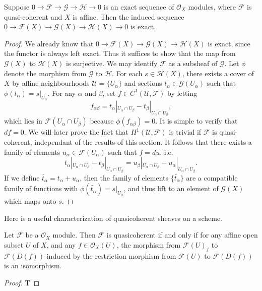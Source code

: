 \begin{theorem}
    Suppose $0 \to \mathcal{F} \to \mathcal{G} \to \mathcal{H} \to 0$ is an exact sequence of $\mathcal{O}_X$ modules, where $\mathcal{F}$ is quasi-coherent and $X$ is affine. Then the induced sequence $0 \to \mathcal{F}(X) \to \mathcal{G}(X) \to \mathcal{H}(X) \to 0$ is exact.
\end{theorem}
\begin{proof}
    We already know that $0 \to \mathcal{F}(X) \to \mathcal{G}(X) \to \mathcal{H}(X)$ is exact, since the functor is always left exact. Thus it suffices to show that the map from $\mathcal{G}(X)$ to $\mathcal{H}(X)$ is surjective. We may identify $\mathcal{F}$ as a subsheaf of $\mathcal{G}$. Let $\phi$ denote the morphism from $\mathcal{G}$ to $\mathcal{H}$. For each $s \in \mathcal{H}(X)$, there exists a cover of $X$ by affine neighbourhoods $\mathcal{U} = \{ U_\alpha \}$ and sections $t_\alpha \in \mathcal{G}(U_\alpha)$ such that $\phi(t_\alpha) = s|_{U_\alpha}$. For any $\alpha$ and $\beta$, set $f \in C^1(\mathcal{U},\mathcal{F})$ by letting
    \[ f_{\alpha \beta} = t_\alpha|_{U_\alpha \cap U_\beta} - t_\beta|_{U_\alpha \cap U_\beta}, \]
    which lies in $\mathcal{F}(U_\alpha \cap U_\beta)$ because $\phi(f_{\alpha \beta}) = 0$. It is simple to verify that $df = 0$. We will later prove the fact that $H^1(\mathcal{U},\mathcal{F})$ is trivial if $\mathcal{F}$ is quasi-coherent, independant of the results of this section. It follows that there exists a family of elements $u_\alpha \in \mathcal{F}(U_\alpha)$ such that $f = du$, i.e.
    \[ t_\alpha|_{U_\alpha \cap U_\beta} - t_\beta|_{U_\alpha \cap U_\beta} = u_\beta|_{U_\alpha \cap U_\beta} - u_\alpha|_{U_\alpha \cap U_\beta}. \]
    If we define $\tilde{t_\alpha} = t_\alpha + u_\alpha$, then the family of elements $\{ \tilde{t_\alpha} \}$ are a compatible family of functions with $\phi(\tilde{t_\alpha}) = s|_{U_\alpha}$, and thus lift to an element of $\mathcal{G}(X)$ which maps onto $s$.
\end{proof}

Here is a useful characterization of quasicoherent sheaves on a scheme.

\begin{theorem}
    Let $\mathcal{F}$ be a $\mathcal{O}_X$ module. Then $\mathcal{F}$ is quasicoherent if and only if for any affine open subset $U$ of $X$, and any $f \in \mathcal{O}_X(U)$, the morphism from $\mathcal{F}(U)_f$ to $\mathcal{F}(D(f))$ induced by the restriction morphism from $\mathcal{F}(U)$ to $\mathcal{F}(D(f))$ is an isomorphism.
\end{theorem}
\begin{proof}
    T
\end{proof}

